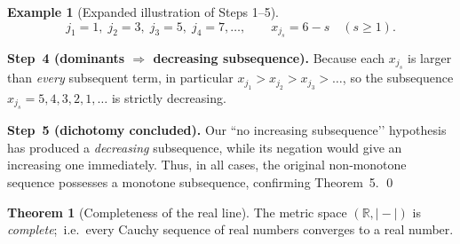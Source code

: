 \documentclass[12pt]{article}
\theoremstyle{definition} %
\newtheorem{theorem}{Theorem}
\newtheorem{example}{Example}
\theoremstyle{plain} %
\begin{document}
\begin{example}[Expanded illustration of Steps 1–5]
  \[
     j_1=1,\;j_2=3,\;j_3=5,\;j_4=7,\dots,
     \qquad
     x_{j_s}=6-s\quad(s\ge1).
  \]
  
  \bigskip\noindent
  \textbf{Step 4 (dominants \(\Rightarrow\) decreasing subsequence).}
  Because each \(x_{j_s}\) is larger than \emph{every} subsequent term,
  in particular
  \(
        x_{j_1}>x_{j_2}>x_{j_3}>\dots
  \),
  so the subsequence
  \(
        x_{j_s}=5,4,3,2,1,\dots
  \)
  is strictly decreasing.
  
  \bigskip\noindent
  \textbf{Step 5 (dichotomy concluded).}
  Our “no increasing subsequence’’ hypothesis has produced a
  \emph{decreasing} subsequence, while its negation
  would give an increasing one immediately.
  Thus, in all cases, the original non‑monotone sequence possesses a
  monotone subsequence, confirming Theorem 5. \qed
  \end{example}
\begin{theorem}[Completeness of the real line]\label{thm:R_complete}
  The metric space $(\mathbb R,|\!-\!|)$ is \emph{complete};\,
  i.e.\ every Cauchy sequence of real numbers converges to a real number.
\end{theorem}
\end{document}
